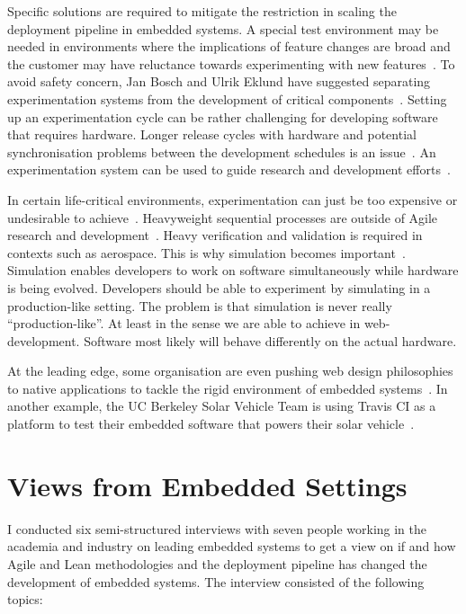 \documentclass[english]{tktltiki2}
\begin{document}
Specific solutions are required to mitigate the restriction in scaling the deployment pipeline in embedded systems. A special test environment may be needed in environments where the implications of feature changes are broad and the customer may have reluctance towards experimenting with new features~\cite{FGM14}. To avoid safety concern, Jan Bosch and Ulrik Eklund have suggested separating experimentation systems from the development of critical components~\cite{BE12}. Setting up an experimentation cycle can be rather challenging for developing software that requires hardware. Longer release cycles with hardware and potential synchronisation problems between the development schedules is an issue~\cite{FGM14}. An experimentation system can be used to guide research and development efforts~\cite{HAB12}.

In certain life-critical environments, experimentation can just be too expensive or undesirable to achieve~\cite{BE12}. Heavyweight sequential processes are outside of Agile research and development~\cite{EHS14}. Heavy verification and validation is required in contexts such as aerospace. This is why simulation becomes important~\cite{KRM13}. Simulation enables developers to work on software simultaneously while hardware is being evolved. Developers should be able to experiment by simulating in a production-like setting. The problem is that simulation is never really “production-like”. At least in the sense we are able to achieve in web-development. Software most likely will behave differently on the actual hardware.

At the leading edge, some organisation are even pushing web design philosophies to native applications to tackle the rigid environment of embedded systems~\cite{Boh13, GZ14}. In another example, the UC Berkeley Solar Vehicle Team is using Travis CI as a platform to test their embedded software that powers their solar vehicle~\cite{Ngy15}.


\section{Views from Embedded Settings}

I conducted six semi-structured interviews with seven people working in the academia and industry on leading embedded systems to get a view on if and how Agile and Lean methodologies and the deployment pipeline has changed the development of embedded systems. The interview consisted of the following topics:
\end{document}
